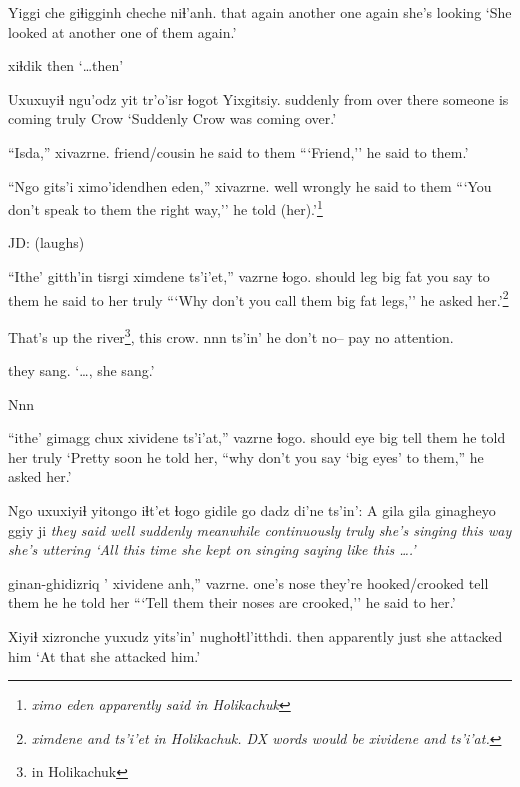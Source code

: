 \documentclass[12pt]{article}
\begin{document}
\gll Yiggi che giɬigginh cheche niɬ'anh.
that  again  {another one}       again  {she's looking}
\glt `She looked at another one of them again.' 
\glend

 xiɬdik
{} then
\glt `\ldots then'
\glend

\gll Uxuxuyiɬ ngu'odz  yit    tr'o'isr          ɬogot Yixgitsiy.
suddenly {from over} there {someone is coming} truly Crow
\glt `Suddenly Crow was coming over.'
\glend

\gll ``Isda,''          xivazrne.
{friend/cousin} {he said to them }
\glt ```Friend,'' he said to them.'
\glend

\gll ``Ngo  gits'i  {ximo'idendhen eden},'' xivazrne.
well wrongly {}  {he said to them}
\glt ```You don't speak to them the right way,'' he told (her).'\footnote{\em ximo eden \em apparently said in Holikachuk}
\glend

JD:  (laughs)

\gll ``Ithe'  gitth'in tisrgi ximdene ts'i'et,'' vazrne         ɬogo.
should leg      {big fat}    {you say to them}    {}     {he said to her} truly
\glt ```Why don't you call them big fat legs,'' he asked her.'\footnote{\em ximdene \em and \em ts'i'et \em in Holikachuk. DX words would be \em xividene \em and \em ts'i'at.}
\glend

That's up the river\footnote{in Holikachuk}, this crow. nnn ts'in' he don't no-- pay no attention.

 they sang. 
{            } 
\glt `\ldots, she sang.'
\glend

Nnn 

 ``ithe'  gimagg chux xividene  ts'i'at,'' vazrne      ɬogo.
{}                should eye    big  {tell them} {}    {he told her} truly
\glt `Pretty soon he told her, ``why don't you say `big eyes' to them,'' he asked her.' 
\glend

\gll Ngo uxuxiyiɬ yitongo   iɬt'et       ɬogo  gidile        {go dadz}  di'ne ts'in': {A gila gila ginagheyo   ggiy ji} \em {they said}
well  suddenly       meanwhile continuously truly {she's singing} {this way} {she's uttering}
\glt `All this time she kept on singing saying like this \ldots.'
\glend

    {ginan-ghidizriq '} xividene  anh,'' vazrne. 
{one's nose} {they're hooked/crooked} {tell them} he  {he told her}
\glt ```Tell them their noses are crooked,'' he said to her.' 
\glend

\gll Xiyiɬ xizronche yuxudz {yits'in' nughoɬtl'itthdi.}
then apparently        just   {she attacked him}
\glt `At that she attacked him.'
\glend
\end{document}
